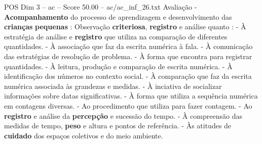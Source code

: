 \begin{textsample}{POS Dim 3 – ac – Score 50.00 – ac/ac\_inf\_26.txt}
Avaliação - \textbf{Acompanhamento} do processo de aprendizagem e desenvolvimento das \textbf{crianças} \textbf{pequenas} : Observação \textbf{criteriosa}, \textbf{registro} e análise quanto : - À estratégia de análise e \textbf{registro} que utiliza na comparação de diferentes quantidades. - À associação que faz da escrita numérica à fala. - À comunicação das estratégias de resolução de problema. - À forma que encontra para registrar quantidades. - À leitura, produção e comparação de escrita numérica. - À identificação dos números no contexto social. - À comparação que faz da escrita numérica associada às grandezas e medidas. - À inciativa de socializar informações sobre datas significativas. - À forma que utiliza a sequência numérica em contagens diversas. - Ao procedimento que utiliza para fazer contagem. - Ao \textbf{registro} e análise da \textbf{percepção} e sucessão do tempo. - À compreensão das medidas de tempo, \textbf{peso} e altura e pontos de referência. - Às atitudes de \textbf{cuidado} dos espaços coletivos e do meio ambiente.

\end{textsample}
